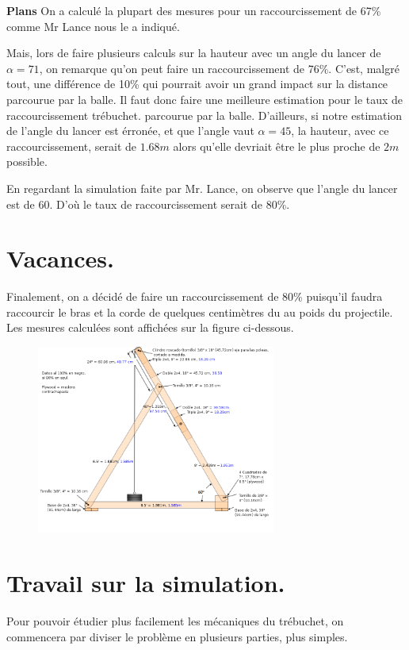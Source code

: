 \documentclass[10pt]{article}
\begin{document}
{\bf Plans}
On a calculé la plupart des mesures pour un raccourcissement de 67\% comme Mr Lance nous le a indiqué.

Mais, lors de faire plusieurs calculs sur la hauteur avec un angle du lancer de $\alpha = 71$\textdegree, on remarque qu'on peut faire
un raccourcissement de 76\%. C'est, malgré tout, une différence de 10\% qui pourrait avoir un grand impact sur la distance
parcourue par la balle. Il faut donc faire une meilleure estimation pour le taux de raccourcissement trébuchet.
parcourue par la balle. D'ailleurs, si notre estimation de l'angle du lancer est érronée, et que l'angle vaut $\alpha = 45$\textdegree, la
hauteur, avec ce raccourcissement, serait de $1.68m$ alors qu'elle devriait être le plus proche de $2m$ possible.

En regardant la simulation faite par Mr. Lance, on observe que l'angle
du lancer est de $60$\textdegree. D'où le taux de raccourcissement serait
de 80\%.

\vspace{1cm}
\section{Vacances.}

Finalement, on a décidé de faire un raccourcissement de 80\% puisqu'il faudra raccourcir le bras et la corde de quelques centimètres du au poids du projectile. Les mesures calculées sont affichées sur la figure ci-dessous. 

\begin{figure}[h]
\centering
\includegraphics[width=0.7\textwidth]{medidas2.png}
\end{figure}

\section{Travail sur la simulation.}
Pour pouvoir étudier plus facilement les mécaniques du trébuchet, on commencera par diviser le problème en plusieurs parties, plus simples.
\end{document}
